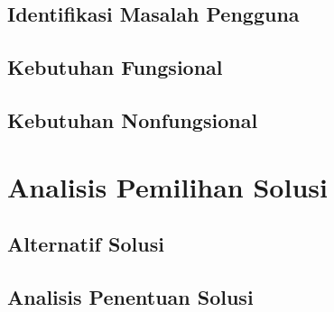 \subsection{Identifikasi Masalah Pengguna}
\lipsum[5]
\subsection{Kebutuhan Fungsional}
\lipsum[6]
\subsection{Kebutuhan Nonfungsional}
\lipsum[7]

\section{Analisis Pemilihan Solusi}
\subsection{Alternatif Solusi}
\lipsum[8]
\subsection{Analisis Penentuan Solusi}
\lipsum[9]